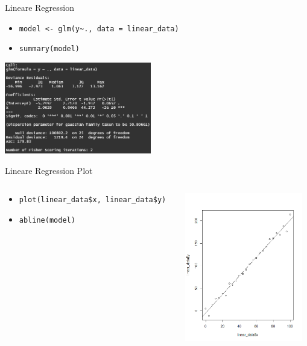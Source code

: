 \documentclass[xcolor=dvipsnames, aspectratio = 169]{beamer}
\begin{document}
\begin{frame}[fragile]{Lineare Regression}
	\begin{itemize}
		\item \verb+model <- glm(y~., data = linear_data)+
		\item \verb+summary(model)+
	\end{itemize}
			
	\begin{center}
		\includegraphics[height=4cm]{LinearRegressionSummary}
	\end{center}
\end{frame}

\begin{frame}[fragile]{Lineare Regression Plot}
	\begin{columns}[T]
		\begin{column}{0.6\textwidth}
			\begin{itemize}
				\item \verb+plot(linear_data$x, linear_data$y)+
				\item \verb+abline(model)+
			\end{itemize}
		\end{column}
		\begin{column}{0.4\textwidth}
			\includegraphics[height=6.5cm]{LinearRegressionPlot}
		\end{column}
	\end{columns}
\end{frame}
\end{document}
